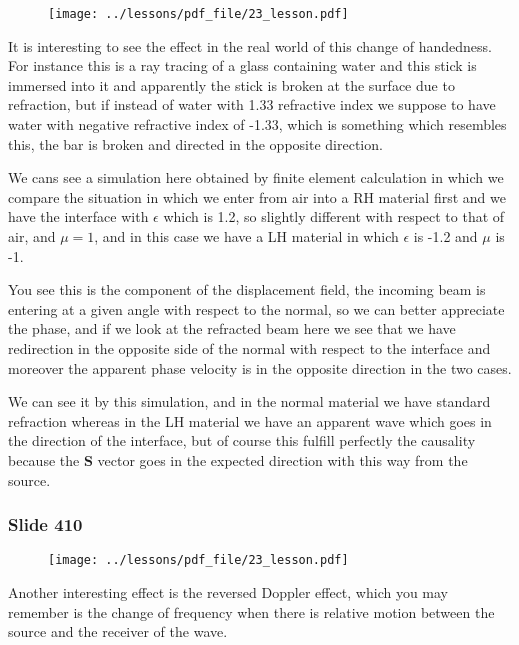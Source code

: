 \documentclass[../main/main.tex]{subfiles}
\begin{document}
\begin{figure}[h!]
\centering
\texttt{[image: ../lessons/pdf\_file/23\_lesson.pdf]}
\end{figure}

It is interesting to see the effect in the real world of this change of handedness. For instance this is a ray tracing of a glass containing water and this stick is immersed into it and apparently the stick is broken at the surface due to refraction, but if instead of water with 1.33 refractive index we suppose to have water with negative refractive index of -1.33, which is something which resembles this, the bar is broken and directed in the opposite direction. 

We cans see a simulation here obtained by finite element calculation in which we compare the situation in which we enter from air into a RH material first and we have the interface with $\epsilon$ which is 1.2, so slightly different with respect to that of air, and $\mu = 1$, and in this case we have a LH material in which $\epsilon$ is -1.2 and $\mu$ is -1.

You see this is the component of the displacement field, the incoming beam is entering at a given angle with respect to the normal, so we can better appreciate the phase, and if we look at the refracted beam here we see that we have redirection in the opposite side of the normal with respect to the interface and moreover the apparent phase velocity is in the opposite direction in the two cases. 

We can see it by this simulation, and in the normal  material we have standard refraction whereas in the LH material we have an apparent wave which goes in the direction of the interface, but of course this fulfill perfectly the causality because the $\mathbf{S}$ vector goes in the expected direction with this way from the source.

\newpage

\subsubsection{Slide 410}

\begin{figure}[h!]
\centering
\texttt{[image: ../lessons/pdf\_file/23\_lesson.pdf]}
\end{figure}

Another interesting effect is the reversed Doppler effect, which you may remember is the change of frequency when there is relative motion between the source and the receiver of the wave.
\end{document}
